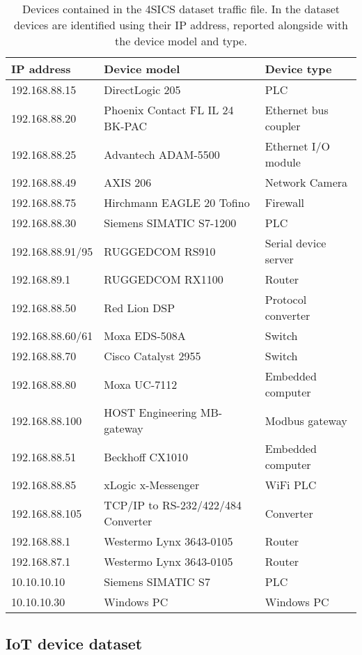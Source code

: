 \begin{table}[H]
    \centering
    \begin{tabular}{l|l|l}
    \toprule
        IP address & Device model & Device type  \\
    \midrule
        192.168.88.15 & DirectLogic 205  & PLC \\
        192.168.88.20 & Phoenix Contact FL IL 24 BK-PAC & Ethernet bus coupler \\
        192.168.88.25 & Advantech ADAM-5500 & Ethernet I/O module \\
        192.168.88.49 & AXIS 206 & Network Camera\\
        192.168.88.75 & Hirchmann EAGLE 20 Tofino  & Firewall \\
192.168.88.30 & Siemens SIMATIC S7-1200 & PLC \\
192.168.88.91/95  & RUGGEDCOM RS910 & Serial device server  \\
192.168.89.1  & RUGGEDCOM RX1100  & Router \\
192.168.88.50 & Red Lion DSP  & Protocol converter \\
192.168.88.60/61 & Moxa EDS-508A & Switch \\
192.168.88.70 & Cisco Catalyst 2955 & Switch \\
192.168.88.80 & Moxa UC-7112 & Embedded computer \\
192.168.88.100 & HOST Engineering MB-gateway & Modbus gateway \\
192.168.88.51 & Beckhoff CX1010 & Embedded computer \\
192.168.88.85 & xLogic x-Messenger  & WiFi PLC \\
192.168.88.105 &TCP/IP to RS-232/422/484 Converter & Converter \\
192.168.88.1 & Westermo Lynx 3643-0105 & Router \\
192.168.87.1 & Westermo Lynx 3643-0105 & Router \\
10.10.10.10  & Siemens SIMATIC S7 & PLC \\
10.10.10.30  & Windows PC & Windows PC \\
    \bottomrule        
    \end{tabular}
    \caption{Devices contained in the 4SICS dataset traffic file. In the dataset devices are identified using their IP address, reported alongside with the device model and type. }
    \label{tab:4sicsdevlist}
\end{table}

\subsection{IoT device dataset} \label{iot_sec}

